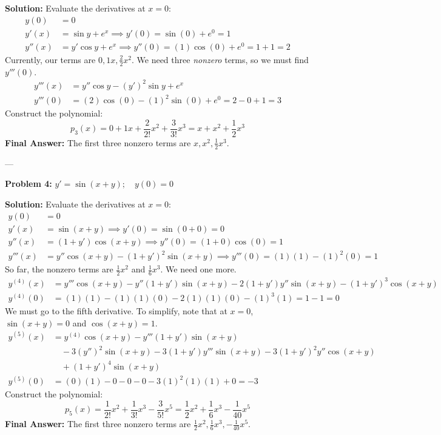 \documentclass[11pt, letterpaper]{article}
\theoremstyle{definition}
\theoremstyle{remark}
\begin{document}
\textbf{Solution:}
Evaluate the derivatives at $x=0$:
\begin{align*}
    y(0) &= 0 \\
    y'(x) &= \sin y + e^x \implies y'(0) = \sin(0) + e^0 = 1 \\
    y''(x) &= y'\cos y + e^x \implies y''(0) = (1)\cos(0) + e^0 = 1 + 1 = 2
\end{align*}
Currently, our terms are $0, 1x, \frac{2}{2}x^2$. We need three \textit{nonzero} terms, so we must find $y'''(0)$.
\begin{align*}
    y'''(x) &= y''\cos y - (y')^2\sin y + e^x \\
    y'''(0) &= (2)\cos(0) - (1)^2\sin(0) + e^0 = 2 - 0 + 1 = 3
\end{align*}
Construct the polynomial:
\[ p_3(x) = 0 + 1x + \frac{2}{2!}x^2 + \frac{3}{3!}x^3 = x + x^2 + \frac{1}{2}x^3 \]
\textbf{Final Answer:} The first three nonzero terms are $x, x^2, \frac{1}{2}x^3$.

---

\textbf{Problem 4:} $y' = \sin(x+y) ; \quad y(0) = 0$

\textbf{Solution:}
Evaluate the derivatives at $x=0$:
\begin{align*}
    y(0) &= 0 \\
    y'(x) &= \sin(x+y) \implies y'(0) = \sin(0+0) = 0 \\
    y''(x) &= (1+y')\cos(x+y) \implies y''(0) = (1+0)\cos(0) = 1 \\
    y'''(x) &= y''\cos(x+y) - (1+y')^2\sin(x+y) \implies y'''(0) = (1)(1) - (1)^2(0) = 1
\end{align*}
So far, the nonzero terms are $\frac{1}{2}x^2$ and $\frac{1}{6}x^3$. We need one more.
\begin{align*}
    y^{(4)}(x) &= y'''\cos(x+y) - y''(1+y')\sin(x+y) - 2(1+y')y''\sin(x+y) - (1+y')^3\cos(x+y) \\
    y^{(4)}(0) &= (1)(1) - (1)(1)(0) - 2(1)(1)(0) - (1)^3(1) = 1 - 1 = 0
\end{align*}
We must go to the fifth derivative. To simplify, note that at $x=0$, $\sin(x+y)=0$ and $\cos(x+y)=1$.
\begin{align*}
    y^{(5)}(x) &= y^{(4)}\cos(x+y) - y'''(1+y')\sin(x+y) \\
    &\quad - 3(y'')^2\sin(x+y) - 3(1+y')y'''\sin(x+y) - 3(1+y')^2 y''\cos(x+y) \\
    &\quad + (1+y')^4\sin(x+y) \\
    y^{(5)}(0) &= (0)(1) - 0 - 0 - 0 - 3(1)^2(1)(1) + 0 = -3
\end{align*}
Construct the polynomial:
\[ p_5(x) = \frac{1}{2!}x^2 + \frac{1}{3!}x^3 - \frac{3}{5!}x^5 = \frac{1}{2}x^2 + \frac{1}{6}x^3 - \frac{1}{40}x^5 \]
\textbf{Final Answer:} The first three nonzero terms are $\frac{1}{2}x^2, \frac{1}{6}x^3, -\frac{1}{40}x^5$.
\end{document}
